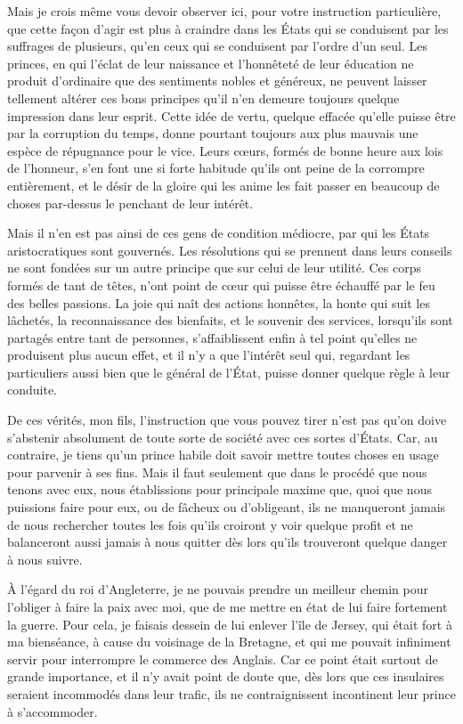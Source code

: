 \documentclass[french,twoside]{book} %
\begin{document}
Mais je crois même vous devoir observer ici, pour votre instruction particulière, que cette façon d’agir est plus à craindre dans les États qui se conduisent par les suffrages de plusieurs, qu’en ceux qui se conduisent par l’ordre d’un seul. Les princes, en qui l’éclat de leur naissance et l’honnêteté de leur éducation ne produit d’ordinaire que des sentiments nobles et généreux, ne peuvent laisser tellement altérer ces bons principes qu’il n’en demeure toujours quelque impression dans leur esprit. Cette idée de vertu, quelque effacée qu’elle puisse être par la corruption du temps, donne pourtant toujours aux plus mauvais une espèce de répugnance pour le vice. Leurs cœurs, formés de bonne heure aux lois de l’honneur, s’en font une si forte habitude qu’ils ont peine de la corrompre entièrement, et le désir de la gloire qui les anime les fait passer en beaucoup de choses par-dessus le penchant de leur intérêt.\par
Mais il n’en est pas ainsi de ces gens de condition médiocre, par qui les États aristocratiques sont gouvernés. Les résolutions qui se prennent dans leurs conseils ne sont fondées sur un autre principe que sur celui de leur utilité. Ces corps formés de tant de têtes, n’ont point de cœur qui puisse être échauffé par le feu des belles passions. La joie qui naît des actions honnêtes, la honte qui suit les lâchetés, la reconnaissance des bienfaits, et le souvenir des services, lorsqu’ils sont partagés entre tant de personnes, s’affaiblissent enfin à tel point qu’elles ne produisent plus aucun effet, et il n’y a que l’intérêt seul qui, regardant les particuliers aussi bien que le général de l’État, puisse donner quelque règle à leur conduite.\par
De ces vérités, mon fils, l’instruction que vous pouvez tirer n’est pas qu’on doive s’abstenir absolument de toute sorte de société avec ces sortes d’États. Car, au contraire, je tiens qu’un prince habile doit savoir mettre toutes choses en usage pour parvenir à ses fins. Mais il faut seulement que dans le procédé que nous tenons avec eux, nous établissions pour principale maxime que, quoi que nous puissions faire pour eux, ou de fâcheux ou d’obligeant, ils ne manqueront jamais de nous rechercher toutes les fois qu’ils croiront y voir quelque profit et ne balanceront aussi jamais à nous quitter dès lors qu’ils trouveront quelque danger à nous suivre.\par
À l’égard du roi d’Angleterre, je ne pouvais prendre un meilleur chemin pour l’obliger à faire la paix avec moi, que de me mettre en état de lui faire fortement la guerre. Pour cela, je faisais dessein de lui enlever l’île de Jersey, qui était fort à ma bienséance, à cause du voisinage de la Bretagne, et qui me pouvait infiniment servir pour interrompre le commerce des Anglais. Car ce point était surtout de grande importance, et il n’y avait point de doute que, dès lors que ces insulaires seraient incommodés dans leur trafic, ils ne contraignissent incontinent leur prince à s’accommoder.\par
\end{document}
